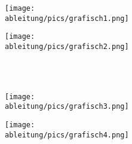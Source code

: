 \documentclass[a4paper,12pt, headsepline, ngerman]{scrartcl}
\theoremstyle{definition}
\begin{document}
\newpage
\begin{minipage}{\textwidth}
	\begin{Exercise}[title={Schätze jeweils die Ableitung an den Stellen -2, 0, 1 und 3 ab.}, label=grafischABlA1]
\begin{minipage}{\textwidth}
	\begin{minipage}{0.49\textwidth}
		\centering\texttt{[image: \\ableitung/pics/grafisch1.png]}
	\end{minipage}
	\begin{minipage}{0.49\textwidth}
		\centering\texttt{[image: \\ableitung/pics/grafisch2.png]}
	\end{minipage}
\end{minipage}\\\phantom{x}\\
\begin{minipage}{\textwidth}
	\begin{minipage}{0.49\textwidth}
		\centering\texttt{[image: \\ableitung/pics/grafisch3.png]}
	\end{minipage}
	\begin{minipage}{0.49\textwidth}
		\centering\texttt{[image: \\ableitung/pics/grafisch4.png]}
	\end{minipage}\\
\end{minipage}
	\end{Exercise}
\end{minipage}
\end{document}
